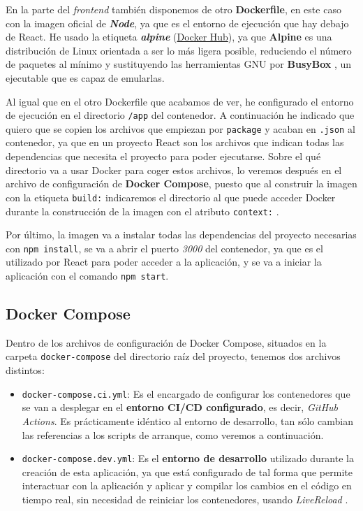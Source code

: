 En la parte del \textit{frontend} también disponemos de otro \textbf{Dockerfile}, en este caso con la imagen oficial de \textit{\textbf{Node}}, ya que es el entorno de ejecución que hay debajo de React. He usado la etiqueta \textit{\textbf{alpine}} (\href{https://hub.docker.com/layers/library/node/alpine/images/sha256-923cd6fac65f6892aa8bbb4208ad708c56b35f9ab86eca07ccc7b56dd28c9c77?context=explore}{Docker Hub}), ya que \textbf{Alpine} es una distribución de Linux orientada a ser lo más ligera posible, reduciendo el número de paquetes al mínimo y sustituyendo las herramientas GNU por \textbf{BusyBox} \cite{wikipedia:busybox}, un ejecutable que es capaz de emularlas.

Al igual que en el otro Dockerfile que acabamos de ver, he configurado el entorno de ejecución en el directorio \verb,/app, del contenedor. A continuación he indicado que quiero que se copien los archivos que empiezan por \verb,package, y acaban en \verb,.json, al contenedor, ya que en un proyecto React son los archivos que indican todas las dependencias que necesita el proyecto para poder ejecutarse. Sobre el qué directorio va a usar Docker para coger estos archivos, lo veremos después en el archivo de configuración de \textbf{Docker Compose}, puesto que al construir la imagen con la etiqueta \verb,build:, indicaremos el directorio al que puede acceder Docker durante la construcción de la imagen con el atributo \verb,context:, \cite{docker:build-context}.

Por último, la imagen va a instalar todas las dependencias del proyecto necesarias con \verb,npm install,, se va a abrir el puerto \textit{3000} del contenedor, ya que es el utilizado por React para poder acceder a la aplicación, y se va a iniciar la aplicación con el comando \verb,npm start,. 

\subsection{Docker Compose}

Dentro de los archivos de configuración de Docker Compose, situados en la carpeta \verb,docker-compose, del directorio raíz del proyecto, tenemos dos archivos distintos:

\begin{itemize}
	\item \verb,docker-compose.ci.yml,: Es el encargado de configurar los contenedores que se van a desplegar en el \textbf{entorno CI/CD configurado}, es decir, \textit{GitHub Actions}. Es prácticamente idéntico al entorno de desarrollo, tan sólo cambian las referencias a los scripts de arranque, como veremos a continuación.
	\item \verb,docker-compose.dev.yml,: Es el \textbf{entorno de desarrollo} utilizado durante la creación de esta aplicación, ya que está configurado de tal forma que permite interactuar con la aplicación y aplicar y compilar los cambios en el código en tiempo real, sin necesidad de reiniciar los contenedores, usando \textit{LiveReload} \cite{codejava:livereload}.
\end{itemize}

